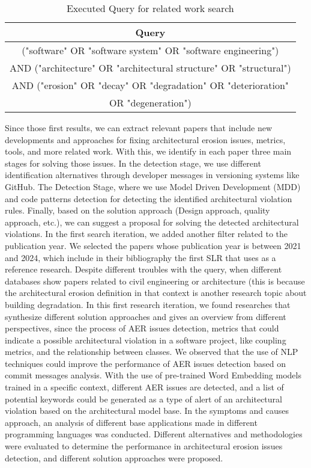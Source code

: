 \begin{table}[H]
    \centering
    \begin{tabular}{|c|}
        \hline
        Query\\
         \hline
             ("software" OR "software system" OR "software engineering") \\
             AND ("architecture" OR "architectural structure" OR "structural") \\
             AND ("erosion" OR "decay" OR "degradation" OR "deterioration"\\
             OR "degeneration") \\
         \hline
    \end{tabular}
    \caption{Executed Query for related work search}
    \label{tab:my_label}
\end{table}

Since those first results, we can extract relevant papers that include new developments and approaches for fixing architectural erosion issues, metrics, tools, and more related work. With this, we identify in each paper three main stages for solving those issues. In the detection stage, we use different identification alternatives through developer messages in versioning systems like GitHub. The Detection Stage, where we use Model Driven Development (MDD) and code patterns detection for detecting the identified architectural violation rules. Finally, based on the solution approach (Design approach, quality approach, etc.), we can suggest a proposal for solving the detected architectural violations.
In the first search iteration, we added another filter related to the publication year. We selected the papers whose publication year is between 2021 and 2024, which include in their bibliography the first SLR that uses as a reference research. Despite different troubles with the query, when different databases show papers related to civil engineering or architecture (this is because the architectural erosion definition in that context is another research topic about building degradation. In this first research iteration, we found researches that synthesize different solution approaches and gives an overview from different perspectives, since the process of AER issues detection, metrics that could indicate a possible architectural violation in a software project, like coupling metrics, and the relationship between classes.
We observed that the use of NLP techniques could improve the performance of AER issues detection based on commit messages analysis. With the use of pre-trained Word Embedding models trained in a specific context, different AER issues are detected, and a list of potential keywords could be generated as a type of alert of an architectural violation based on the architectural model base.
In the symptoms and causes approach, an analysis of different base applications made in different programming languages was conducted. Different alternatives and methodologies were evaluated to determine the performance in architectural erosion issues detection, and different solution approaches were proposed.

